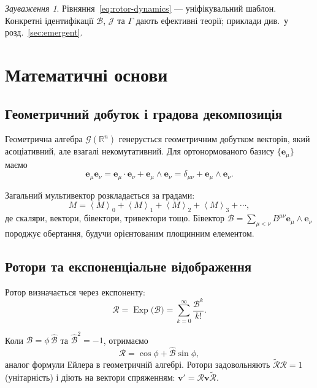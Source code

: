 \documentclass[11pt,a4paper]{article}
\newcommand{\e}{\mathbf{e}}
\newcommand{\R}{\mathbb{R}}
\newcommand{\grade}[2]{\left\langle #1 \right\rangle_{#2}}
\newcommand{\scal}[1]{\grade{#1}{0}}
\newcommand{\vecp}[1]{\grade{#1}{1}}
\newcommand{\biv}[1]{\grade{#1}{2}}
\newcommand{\triv}[1]{\grade{#1}{3}}
\newcommand{\rev}[1]{\widetilde{#1}}           %
\newcommand{\Exp}{\operatorname{Exp}}
\newcommand{\Rotor}{\mathcal{R}}
\newcommand{\Biv}{\mathcal{B}}
\theoremstyle{definition}
\theoremstyle{plain}
\theoremstyle{remark}
\newtheorem{remark}{Зауваження}
\begin{document}
\begin{remark}
Рівняння~\eqref{eq:rotor-dynamics} — уніфікувальний шаблон. Конкретні ідентифікації $\Biv$, $\mathcal{J}$ та $\Gamma$ дають ефективні теорії; приклади див.~у розд.~\ref{sec:emergent}.
\end{remark}

\vspace{1em}

\section{Математичні основи}\label{sec:math}

\subsection{Геометричний добуток і градова декомпозиція}

Геометрична алгебра $\mathcal{G}(\R^n)$ генерується геометричним добутком векторів, який асоціативний, але взагалі некомутативний. Для ортонормованого базису $\{\e_\mu\}$ маємо
\begin{equation}
\e_\mu \e_\nu = \e_\mu \cdot \e_\nu + \e_\mu \wedge \e_\nu = \delta_{\mu\nu} + \e_\mu \wedge \e_\nu.
\end{equation}

Загальний мультивектор розкладається за градами:
\begin{equation}
M = \scal{M} + \vecp{M} + \biv{M} + \triv{M} + \cdots,
\end{equation}
де скаляри, вектори, бівектори, тривектори тощо. Бівектор $\Biv = \sum_{\mu<\nu} B^{\mu\nu} \e_\mu \wedge \e_\nu$ породжує обертання, будучи орієнтованим площинним елементом.

\subsection{Ротори та експоненціальне відображення}

Ротор визначається через експоненту:
\begin{equation}
\Rotor = \Exp\!\big(\Biv\big) = \sum_{k=0}^\infty \frac{\Biv^k}{k!}.
\end{equation}

Коли $\Biv = \phi\,\hat{\Biv}$ та $\hat{\Biv}^2 = -1$, отримаємо
\begin{equation}
\Rotor = \cos\phi + \hat{\Biv}\sin\phi,
\end{equation}
аналог формули Ейлера в геометричній алгебрі. Ротори задовольняють $\rev{\Rotor}\Rotor = 1$ (унітарність) і діють на вектори спряженням: $\mathbf{v}' = \Rotor \mathbf{v} \rev{\Rotor}$.
\end{document}
